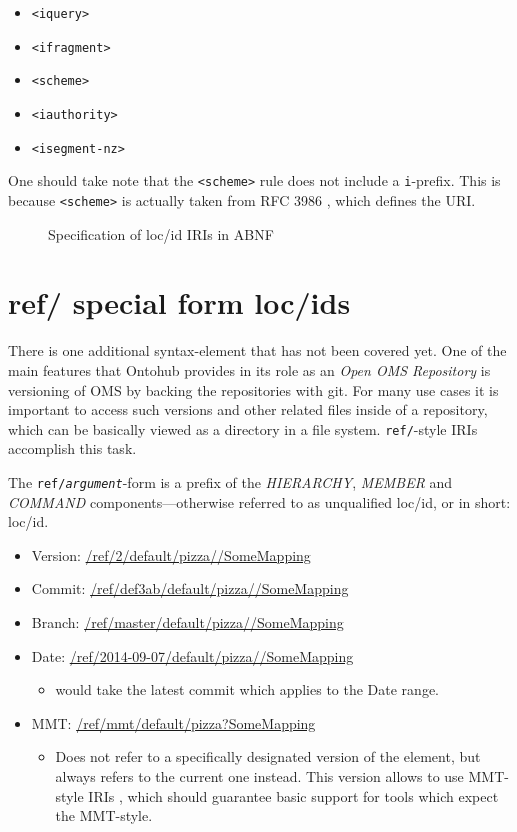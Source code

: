 \documentclass[10pt,fleqn,final]{scrreprt}
\begin{document}
\begin{itemize}
  \item \texttt{<iquery>}
  \item \texttt{<ifragment>}
  \item \texttt{<scheme>}
  \item \texttt{<iauthority>}
  \item \texttt{<isegment-nz>}
\end{itemize}

One should take note that the \texttt{<scheme>} rule does not include a
\texttt{i}-prefix.  This is because \texttt{<scheme>} is actually taken from
RFC 3986 \cite{rfc3986}, which defines the URI.

\begin{figure}[b]
  \centering
  
  \caption[loc/id specification in ABNF]
   {Specification of loc/id IRIs in ABNF}
  \label{lst:loc-id-spec}
\end{figure}

\clearpage
\section{ref/ special form loc/ids}

There is one additional syntax-element that has not been covered yet. One of the
main features that Ontohub provides in its role as an \emph{Open OMS Repository}
is versioning of OMS by backing the repositories with git. For many use cases it is 
important to access such versions and other related files inside of a
repository, which can be basically viewed as a directory in a file system.
\texttt{ref/}-style IRIs accomplish this task.

The \texttt{ref/\emph{argument}}-form is a prefix of the \emph{HIERARCHY},
\emph{MEMBER} and \emph{COMMAND} components---otherwise referred to as
unqualified loc/id, or in short: loc/id.

\begin{itemize}
  \item Version: \url{/ref/2/default/pizza//SomeMapping}
  \item Commit: \url{/ref/def3ab/default/pizza//SomeMapping}
  \item Branch: \url{/ref/master/default/pizza//SomeMapping}
  \item Date: \url{/ref/2014-09-07/default/pizza//SomeMapping}
    \begin{itemize}
      \item would take the latest commit which applies to the Date range.
    \end{itemize}
  \item MMT: \url{/ref/mmt/default/pizza?SomeMapping}
    \begin{itemize}
      \item Does not refer to a specifically designated version of the element,
        but always refers to the current one instead. This version allows to
        use MMT-style IRIs \cite{RabKoh:WSMSML13}, 
        which should guarantee basic support for tools
        which expect the MMT-style.
    \end{itemize}
\end{itemize}
\end{document}
